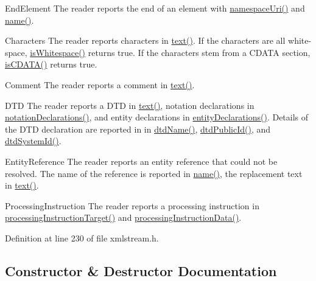 End\+Element The reader reports the end of an element with \hyperlink{class_xml_stream_reader_a4ea3344f8632d1cd70edfaddf9a8027c}{namespace\+Uri()} and \hyperlink{class_xml_stream_reader_a09b44691e1e74daa6bdd4ed465d3c0a2}{name()}.

Characters The reader reports characters in \hyperlink{class_xml_stream_reader_a1d129d0171b231efac34d7ee4480a50f}{text()}. If the characters are all white-\/space, \hyperlink{class_xml_stream_reader_a15550b223a59978b612b0fc32bd543e1}{is\+Whitespace()} returns {\ttfamily true}. If the characters stem from a C\+D\+A\+TA section, \hyperlink{class_xml_stream_reader_ad1c5f23d9c60ab41c032940191d71ae4}{is\+C\+D\+A\+T\+A()} returns {\ttfamily true}.

Comment The reader reports a comment in \hyperlink{class_xml_stream_reader_a1d129d0171b231efac34d7ee4480a50f}{text()}.

D\+TD The reader reports a D\+TD in \hyperlink{class_xml_stream_reader_a1d129d0171b231efac34d7ee4480a50f}{text()}, notation declarations in \hyperlink{class_xml_stream_reader_af1980e6e4fa0ec4468bb384000bf33db}{notation\+Declarations()}, and entity declarations in \hyperlink{class_xml_stream_reader_a1746b1c8df6ec7a4172c5dbee907bfb3}{entity\+Declarations()}. Details of the D\+TD declaration are reported in in \hyperlink{class_xml_stream_reader_a17977920c069d3e4a71182aa07cb4eaa}{dtd\+Name()}, \hyperlink{class_xml_stream_reader_a5b8d61714dde7a6f75aa16555b85db18}{dtd\+Public\+Id()}, and \hyperlink{class_xml_stream_reader_a8021ea53fd25af7404bfe81a2e4e7bdd}{dtd\+System\+Id()}.

Entity\+Reference The reader reports an entity reference that could not be resolved. The name of the reference is reported in \hyperlink{class_xml_stream_reader_a09b44691e1e74daa6bdd4ed465d3c0a2}{name()}, the replacement text in \hyperlink{class_xml_stream_reader_a1d129d0171b231efac34d7ee4480a50f}{text()}.

Processing\+Instruction The reader reports a processing instruction in \hyperlink{class_xml_stream_reader_a66bd483fca16586142dd890cacb9b967}{processing\+Instruction\+Target()} and \hyperlink{class_xml_stream_reader_a2c9146676cc92895abaadc89f6fbc738}{processing\+Instruction\+Data()}. 

Definition at line 230 of file xmlstream.\+h.



\subsection{Constructor \& Destructor Documentation}
\mbox{\label{class_xml_stream_reader_ac25232b146a8737e6735544116fb703d}} 
